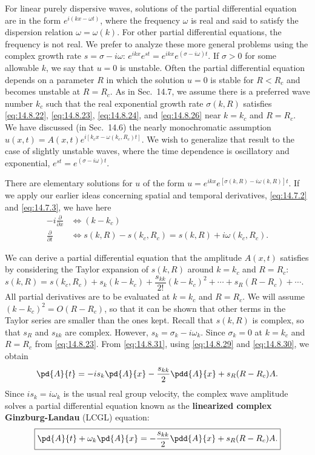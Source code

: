 For linear purely dispersive waves, solutions of the partial differential equation are in the form $e^{i(kx - \omega t)}$, where the frequency $\omega$ is real and said to satisfy the dispersion relation $\omega = \omega(k)$. For other partial differential equations, the frequency is not real. We prefer to analyze these more general problems using the complex growth rate $s = \sigma - i\omega$: $e^{ikx}e^{st} = e^{ikx}e^{(\sigma - i\omega)t}$. If $\sigma > 0$ for some allowable $k$, we say that $u = 0$ is unstable. Often the partial differential equation depends on a parameter $R$ in which the solution $u = 0$ is stable for $R < R_c$ and becomes unstable at $R = R_c$. As in Sec.\ 14.7, we assume there is a preferred wave number $k_c$ such that the real exponential growth rate $\sigma(k,R)$ satisfies \eqref{eq:14.8.22}, \eqref{eq:14.8.23}, \eqref{eq:14.8.24}, and \eqref{eq:14.8.26} near $k = k_c$ and $R = R_c$. We have discussed (in Sec.\ 14.6) the nearly monochromatic assumption $u(x,t) = A(x,t)e^{i[k_c x - \omega(k_c, R_c)t]}$. We wish to generalize that result to the case of slightly unstable waves, where the time dependence is oscillatory and exponential, $e^{st} = e^{(\sigma - i\omega)t}$.

There are elementary solutions for $u$ of the form $u = e^{ikx}e^{[\sigma(k,R) - i\omega(k,R)]t}$. If we apply our earlier ideas concerning spatial and temporal derivatives, \eqref{eq:14.7.2} and \eqref{eq:14.7.3}, we have here
\begin{align}
-i\frac{\partial}{\partial x} &\iff (k - k_c) \label{eq:14.8.29} \\
\frac{\partial}{\partial t} &\iff s(k, R) - s(k_c, R_c) = s(k, R) + i\omega(k_c, R_c). \label{eq:14.8.30}
\end{align}

We can derive a partial differential equation that the amplitude $A(x,t)$ satisfies by considering the Taylor expansion of $s(k,R)$ around $k = k_c$ and $R = R_c$:
\begin{equation}
s(k, R) = s(k_c, R_c) + s_k(k - k_c) + \frac{s_{kk}}{2!}(k - k_c)^2 + \cdots + s_R(R - R_c) + \cdots. \quad
\label{eq:14.8.31}
\end{equation}
All partial derivatives are to be evaluated at $k = k_c$ and $R = R_c$. We will assume $(k - k_c)^2 = O(R - R_c)$, so that it can be shown that other terms in the Taylor series are smaller than the ones kept. Recall that $s(k, R)$ is complex, so that $s_R$ and $s_{kk}$ are complex. However, $s_k = \sigma_k - i\omega_k$. Since $\sigma_k = 0$ at $k = k_c$ and $R = R_c$ from \eqref{eq:14.8.23}. From \eqref{eq:14.8.31}, using \eqref{eq:14.8.29} and \eqref{eq:14.8.30}, we obtain
\[
\pd{A}{t} = -is_k\pd{A}{x} - \frac{s_{kk}}{2}\pdd{A}{x} + s_R(R - R_c)A.
\]
Since $is_k = i\omega_k$ is the usual real group velocity, the complex wave amplitude solves a partial differential equation known as the \textbf{linearized complex Ginzburg-Landau} (LCGL) equation:
\begin{equation}
\boxed{\pd{A}{t} + \omega_k\pd{A}{x} = -\frac{s_{kk}}{2}\pdd{A}{x} + s_R(R - R_c)A.}
\label{eq:14.8.32}
\end{equation}

